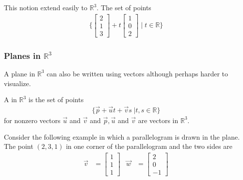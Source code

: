This notion extend easily to $\mathbb{R}^3$.  The set of points 
%
\begin{align*}
\{ 
\begin{bmatrix}
2 \\ 1 \\ 3
\end{bmatrix} + t \begin{bmatrix}
1 \\ 0 \\ 2
\end{bmatrix} \; | \; t \in \mathbb{R} \} 
\end{align*}



\begin{center}
\end{center}

\subsubsection{Planes in $\mathbb{R}^3$}  

A plane in $\mathbb{R}^3$ can also be written using vectors although perhaps harder to visualize.  

\begin{definition}
A  in $\mathbb{R}^3$ is the set of points 
%
\begin{align*}
\{ \vec{p} + \vec{u} t + \vec{v} s \; | t,s \in \mathbb{R} \}
\end{align*}
for nonzero vectors $\vec{u}$ and $\vec{v}$ and $\vec{p},\vec{u}$ and $\vec{v}$ are vectors in $\mathbb{R}^3$.    
\end{definition}


Consider the following example in which a parallelogram is drawn in the plane.  The point $(2,3,1)$ in one corner of the parallelogram and the two sides are 
%
\begin{align*}
\vec{v} & = \begin{bmatrix}
1 \\ 1 \\1 
\end{bmatrix} & \vec{w} & = \begin{bmatrix}
2 \\ 0 \\ -1
\end{bmatrix}
\end{align*}

